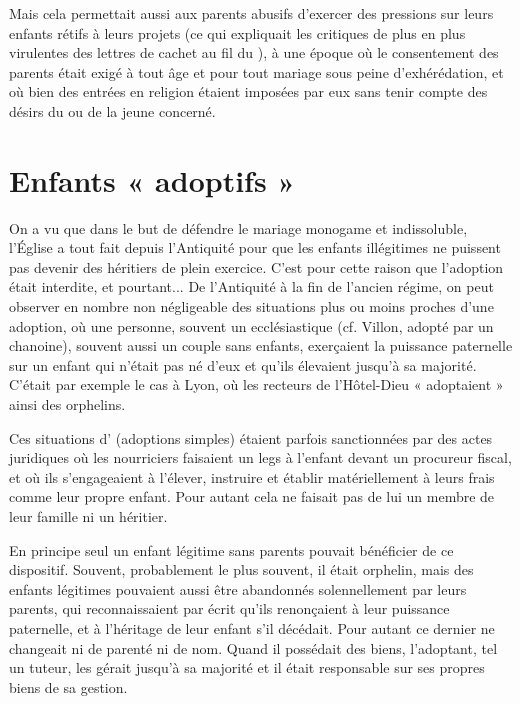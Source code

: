 Mais cela permettait aussi aux parents abusifs d'exercer des pressions sur leurs enfants rétifs à leurs projets (ce qui expliquait les critiques de plus en plus virulentes des lettres de cachet au fil du ), à une époque où le consentement des parents était exigé à tout âge et pour tout mariage sous peine d'exhérédation, et où bien des entrées en religion étaient imposées par eux sans tenir compte des désirs du ou de la jeune concerné. 

\section{Enfants « adoptifs »}

 On a vu que dans le but de défendre le mariage monogame et indissoluble, l'Église a tout fait depuis l'Antiquité pour que les enfants illégitimes ne puissent pas devenir des héritiers de plein exercice. C'est pour cette raison que l'adoption était interdite, et pourtant... De l'Antiquité à la fin de l'ancien régime, on peut observer en nombre non négligeable des situations plus ou moins proches d'une adoption, où une personne, souvent un ecclésiastique (cf. \hbox{Villon}, adopté par un chanoine), souvent aussi un couple sans enfants, exerçaient la puissance paternelle sur un enfant qui n'était pas né d'eux et qu'ils élevaient jusqu'à sa majorité. C'était par exemple le cas à Lyon, où les recteurs de l'Hôtel-Dieu « adoptaient » ainsi des orphelins. 

 Ces situations d' (adoptions simples) étaient parfois sanctionnées par des actes juridiques où les nourriciers faisaient un legs à l'enfant devant un procureur fiscal, et où ils s'engageaient à l'élever, instruire et établir matériellement à leurs frais comme leur propre enfant. Pour autant cela ne faisait pas de lui un membre de leur famille ni un héritier. 

 En principe seul un enfant légitime sans parents pouvait bénéficier de ce dispositif. Souvent, probablement le plus souvent, il était orphelin, mais des enfants légitimes pouvaient aussi être abandonnés solennellement par leurs parents, qui reconnaissaient par écrit qu'ils renonçaient à leur puissance paternelle, et à l'héritage de leur enfant s'il décédait. Pour autant ce dernier ne changeait ni de parenté ni de nom. Quand il possédait des biens, l'adoptant, tel un tuteur, les gérait jusqu'à sa majorité et il était responsable sur ses propres biens de sa gestion. 

